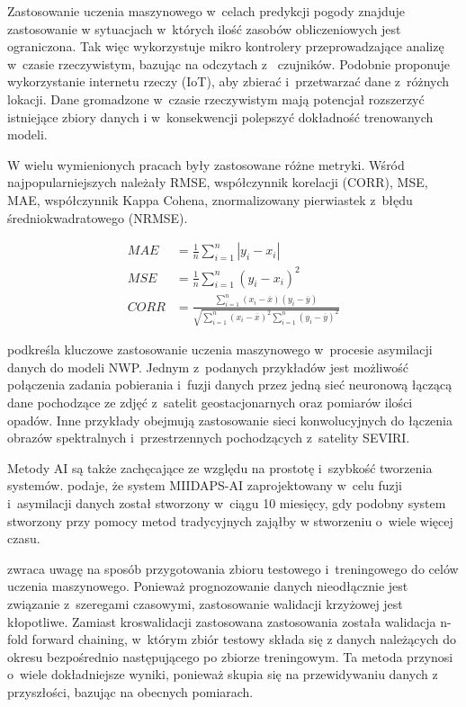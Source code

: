 Zastosowanie uczenia maszynowego w~celach predykcji pogody znajduje zastosowanie
w sytuacjach w~których ilość zasobów obliczeniowych jest ograniczona. Tak więc
\cite{weather-forecasting-using-ml} wykorzystuje
mikro kontrolery przeprowadzające analizę w~czasie rzeczywistym, bazując na odczytach z~
czujników. Podobnie \cite{smart-weather-forecasting}
proponuje wykorzystanie internetu rzeczy (IoT), aby zbierać i~przetwarzać dane z~różnych lokacji.
Dane gromadzone w~czasie rzeczywistym mają potencjał rozszerzyć istniejące zbiory danych
i w~konsekwencji polepszyć dokładność trenowanych modeli.

W wielu wymienionych pracach \cite{development-and-application-of-ml-in}
były zastosowane różne metryki. Wśród najpopularniejszych
należały RMSE, współczynnik korelacji (CORR), MSE, MAE, współczynnik Kappa Cohena,
znormalizowany pierwiastek z~błędu średniokwadratowego (NRMSE).

\begin{align}
    MAE &= \frac{1}{n}\sum_{i=1}^n |y_i - x_i|\\
    MSE &= \frac{1}{n}\sum_{i=1}^n (y_i-x_i)^2\\
    CORR &= \frac{\sum_{i=1}^n (x_i-\overline{x})(y_i-\overline{y})}
    {\sqrt{\sum_{i=1}^n (x_i-\overline{x})^2\sum_{i=1}^n (y_i-\overline{y})^2}}
\end{align}

\cite{ai-revolutionises-weather-prediction}
podkreśla kluczowe zastosowanie uczenia maszynowego w~procesie asymilacji danych do modeli NWP.
Jednym z~podanych przykładów jest możliwość połączenia zadania pobierania i~fuzji danych 
przez jedną sieć neuronową łączącą dane pochodzące ze zdjęć z~satelit geostacjonarnych oraz 
pomiarów ilości opadów. Inne przykłady obejmują zastosowanie sieci konwolucyjnych do łączenia
obrazów spektralnych i~przestrzennych pochodzących z~satelity SEVIRI. 

Metody AI są także zachęcające ze względu na prostotę i~szybkość tworzenia systemów.
\cite{ai-revolutionises-weather-prediction}
podaje, że system MIIDAPS-AI zaprojektowany w~celu fuzji i~asymilacji danych został stworzony w~ciągu 10 miesięcy, 
gdy podobny system stworzony przy pomocy metod tradycyjnych zająłby
w stworzeniu o~wiele więcej czasu.

\cite{ml-applied-to-weather-forecasting}
zwraca uwagę na sposób przygotowania zbioru testowego i~treningowego do celów uczenia 
maszynowego. Ponieważ prognozowanie danych nieodłącznie jest związanie z~szeregami czasowymi,
zastosowanie walidacji krzyżowej jest kłopotliwe. Zamiast kroswalidacji zastosowana 
zastosowania została walidacja n-fold forward chaining, w~którym zbiór testowy składa się 
z danych należących do okresu bezpośrednio następującego po zbiorze treningowym. Ta metoda
przynosi o~wiele dokładniejsze wyniki, ponieważ skupia się na przewidywaniu danych 
z przyszłości, bazując na obecnych pomiarach.

